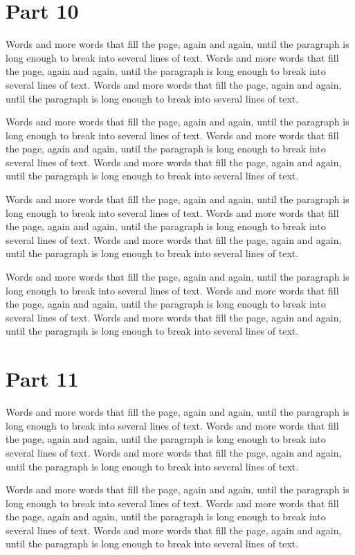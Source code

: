 \documentclass{article}
\begin{document}
\section{Part 10}
Words and more words that fill the page, again and again, until the paragraph is long enough to break into several lines of text. Words and more words that fill the page, again and again, until the paragraph is long enough to break into several lines of text. Words and more words that fill the page, again and again, until the paragraph is long enough to break into several lines of text. 

Words and more words that fill the page, again and again, until the paragraph is long enough to break into several lines of text. Words and more words that fill the page, again and again, until the paragraph is long enough to break into several lines of text. Words and more words that fill the page, again and again, until the paragraph is long enough to break into several lines of text. 

Words and more words that fill the page, again and again, until the paragraph is long enough to break into several lines of text. Words and more words that fill the page, again and again, until the paragraph is long enough to break into several lines of text. Words and more words that fill the page, again and again, until the paragraph is long enough to break into several lines of text. 

Words and more words that fill the page, again and again, until the paragraph is long enough to break into several lines of text. Words and more words that fill the page, again and again, until the paragraph is long enough to break into several lines of text. Words and more words that fill the page, again and again, until the paragraph is long enough to break into several lines of text. 

\section{Part 11}
Words and more words that fill the page, again and again, until the paragraph is long enough to break into several lines of text. Words and more words that fill the page, again and again, until the paragraph is long enough to break into several lines of text. Words and more words that fill the page, again and again, until the paragraph is long enough to break into several lines of text. 

Words and more words that fill the page, again and again, until the paragraph is long enough to break into several lines of text. Words and more words that fill the page, again and again, until the paragraph is long enough to break into several lines of text. Words and more words that fill the page, again and again, until the paragraph is long enough to break into several lines of text. 
\end{document}
